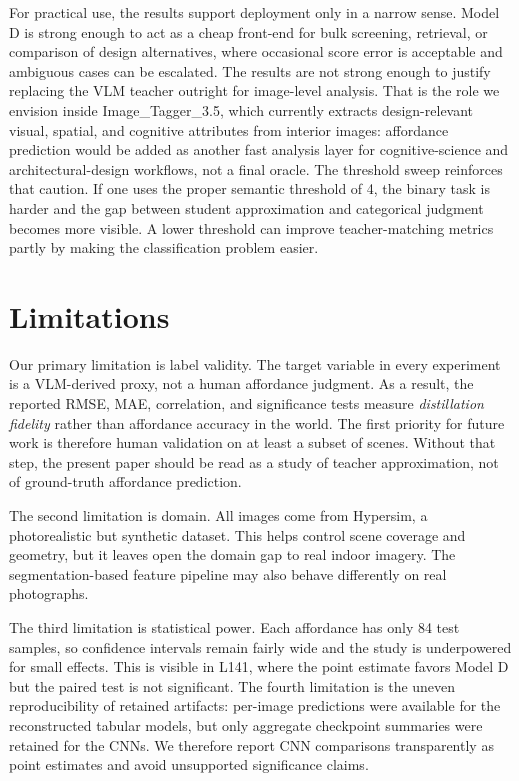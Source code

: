 \documentclass[10pt,twocolumn]{article}
\begin{document}
For practical use, the results support deployment only in a narrow sense.
Model D is strong enough to act as a cheap front-end for bulk screening,
retrieval, or comparison of design alternatives, where occasional score error
is acceptable and ambiguous cases can be escalated. The results are not strong
enough to justify replacing the VLM teacher outright for image-level analysis.
That is the role we envision inside Image\_Tagger\_3.5, which currently
extracts design-relevant visual, spatial, and cognitive attributes from
interior images: affordance prediction would be added as another fast analysis
layer for cognitive-science and architectural-design workflows, not a final
oracle. The threshold sweep reinforces that caution. If one uses the proper
semantic threshold of 4, the binary task is harder and the gap between student
approximation and categorical judgment becomes more visible. A lower threshold
can improve teacher-matching metrics partly by making the classification
problem easier.

\section{Limitations}
\label{sec:limitations}

Our primary limitation is label validity. The target variable in every
experiment is a VLM-derived proxy, not a human affordance judgment. As a
result, the reported RMSE, MAE, correlation, and significance tests measure
\emph{distillation fidelity} rather than affordance accuracy in the world. The
first priority for future work is therefore human validation on at least a
subset of scenes. Without that step, the present paper should be read as a
study of teacher approximation, not of ground-truth affordance prediction.

The second limitation is domain. All images come from Hypersim, a photorealistic
but synthetic dataset. This helps control scene coverage and geometry, but it
leaves open the domain gap to real indoor imagery. The segmentation-based
feature pipeline may also behave differently on real photographs.

The third limitation is statistical power. Each affordance has only 84 test
samples, so confidence intervals remain fairly wide and the study is underpowered
for small effects. This is visible in L141, where the point estimate favors
Model D but the paired test is not significant. The fourth limitation is the
uneven reproducibility of retained artifacts: per-image predictions were
available for the reconstructed tabular models, but only aggregate checkpoint
summaries were retained for the CNNs. We therefore report CNN comparisons
transparently as point estimates and avoid unsupported significance claims.
\end{document}
